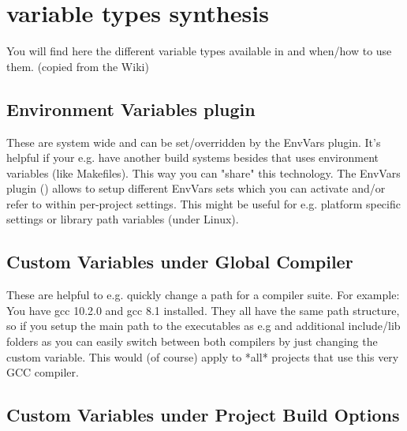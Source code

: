 \section{\codeblocks variable types synthesis}\label{sec:cb_variables_types}

You will find here the different variable types available in \codeblocks and when/how to use them. (copied from the Wiki)

\subsection{Environment Variables plugin}

These are system wide and can be set/overridden by the EnvVars plugin.
It's helpful if your e.g. have another build systems besides \codeblocks that uses environment variables (like Makefiles). This way you can "share" this technology.
The EnvVars plugin () allows to setup different EnvVars sets which you can activate and/or refer to within per-project settings.
This might be useful for e.g. platform specific settings or library path variables (under Linux). 

\subsection{Custom Variables under Global Compiler}

These are helpful to e.g. quickly change a path for a compiler suite.
For example: You have gcc 10.2.0 and gcc 8.1 installed. They all have the same path structure, so if you setup the main path to the executables as e.g  
and additional include/lib  folders as you can easily switch between both compilers by just changing the custom variable. 
This would (of course) apply to *all* projects that use this very GCC compiler. 

\subsection{Custom Variables under Project Build Options}

